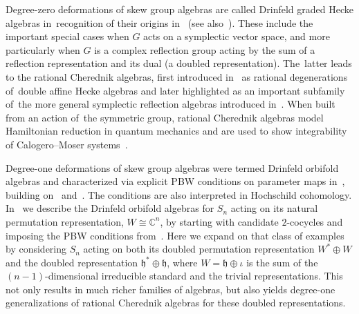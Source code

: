 \documentclass[10pt,a4paper]{amsart}
\numberwithin{equation}{section}
\begin{document}
Degree-zero deformations of skew group algebras are called Drinfeld graded Hecke algebras in~recognition of their origins in~\cite{Drinfeld1986} (see also~\cite{Lusztig1988}).
These include the important special cases when $G$ acts on a symplectic vector space,
and more particularly when $G$ is a complex reflection group acting by the sum of a
reflection representation and its dual (a doubled representation). The~lat\-ter leads
to the rational Cherednik algebras, first introduced in~\cite{Cherednik1991} as rational
dege\-ne\-ra\-tions of~double affine Hecke algebras and later highlighted as an important
subfamily of~the more general symplectic reflection algebras introduced in~\cite{EtingofGinzburg2002}.
When built from an action of~the symmetric group, rational Cherednik
algebras model Hamiltonian reduction in quantum mechanics and are used to show
integrability of Calogero--Moser systems~\cite{Etingof2007}.

Degree-one deformations of skew group algebras were termed Drinfeld orbifold algebras and
characterized via explicit PBW conditions on parameter maps in~\cite{SWorbifold}, building on~\cite{Bergman1978} and~\cite{BravermanGaitsgory}.
The conditions are also interpreted in Hochschild cohomology.
In~\cite{FGK} we describe the Drinfeld orbifold algebras for $S_n$ acting on its natural
permutation representation, $W\cong \mathbb{C}^n$, by starting with candidate $2$-cocycles and imposing the
PBW conditions from~\cite{SWorbifold}.
Here we expand on that class of examples by considering $S_n$
acting on both its doubled permutation representation $W^*\oplus W$ and the doubled representation
$\mathfrak{h}^*\oplus \mathfrak{h}$, where $W=\mathfrak{h} \oplus \iota$ is the sum of the $(n-1)$-dimensional irreducible
standard and the trivial representations. This not only results in much richer families
of algebras, but also yields degree-one generalizations of rational Cherednik algebras for these
doubled representations.
\end{document}
